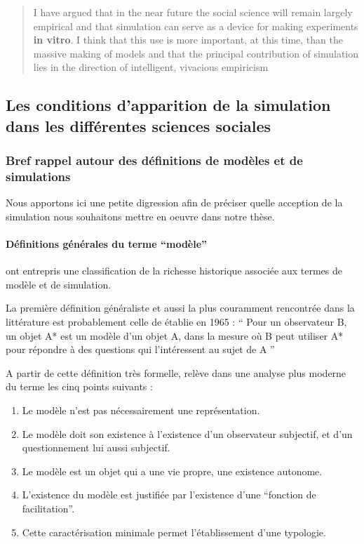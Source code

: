 \foreignblockquote{english}[\cite{Fleisher1965}]{I have argued that in the near future the social science will remain largely empirical and that simulation can serve as a device for making experiments \textbf{in vitro}. I think that this use is more important, at this time, than the massive making of models and that the principal contribution of simulation lies in the direction of intelligent, vivacious empiricism}


\subsection{Les conditions d'apparition de la simulation dans les différentes sciences sociales }
\label{sec:apparition_simu_science_sociales}

\subsubsection{Bref rappel autour des définitions de modèles et de simulations}
\label{ssec:rapell_termes_generiques}

Nous apportons ici une petite digression afin de préciser quelle acception de la simulation nous souhaitons mettre en oeuvre dans notre thèse.

\paragraph{Définitions générales du terme \enquote{modèle}}

\textcite{Varenne2013} ont entrepris une classification de la richesse historique associée aux termes de modèle et de simulation.

La première définition généraliste et aussi la plus couramment rencontrée dans la littérature est probablement celle de \textcite{Minsky1965} établie en 1965 : \enquote{ Pour un observateur B, un objet A* est un modèle d’un objet A, dans la mesure où B peut utiliser A* pour répondre à des questions qui l’intéressent au sujet de A } \autocites{Varenne2008}[15]{Varenne2013}

A partir de cette définition très formelle, \textcite{Varenne2008} relève dans une analyse plus moderne du terme les cinq points suivants : 
\begin{enumerate}
  \item Le modèle n'est pas nécessairement une représentation.
  \item Le modèle doit son existence à l'existence d'un observateur subjectif, et d'un questionnement lui aussi subjectif.
  \item Le modèle est un objet qui a une vie propre, une existence autonome.
  \item L'existence du modèle est justifiée par l'existence d'une \enquote{fonction de facilitation}.
  \item Cette caractérisation minimale permet l'établissement d'une typologie.
\end{enumerate}

